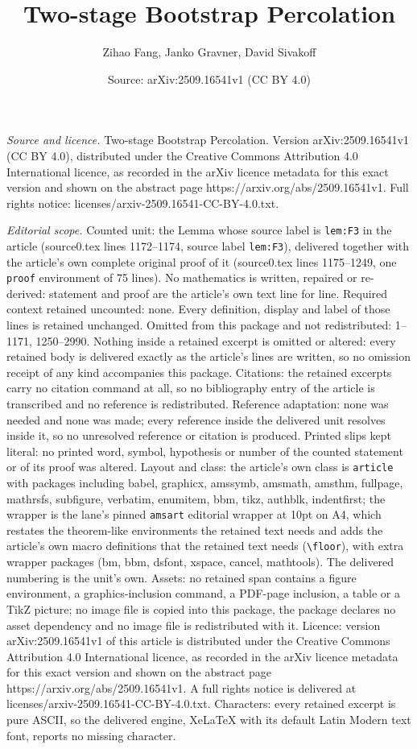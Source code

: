 \documentclass[10pt,a4paper]{amsart}
\title[Two-stage Bootstrap Percolation]{Two-stage Bootstrap Percolation}
\author{Zihao Fang, Janko Gravner, David Sivakoff}
\date{Source: arXiv:2509.16541v1 (CC BY 4.0)}
\begin{document}
\maketitle

\noindent\emph{Source and licence.} Two-stage Bootstrap Percolation. Version arXiv:2509.16541v1 (CC BY 4.0), distributed under the Creative Commons Attribution 4.0 International licence, as recorded in the arXiv licence metadata for this exact version and shown on the abstract page https://arxiv.org/abs/2509.16541v1. Full rights notice: licenses/arxiv-2509.16541-CC-BY-4.0.txt.\par\smallskip

\noindent\textit{Editorial scope.} Counted unit: the Lemma whose source label is \texttt{lem:F3} in the article (source0.tex lines 1172--1174, source label \texttt{lem:F3}), delivered together with the article's own complete original proof of it (source0.tex lines 1175--1249, one \texttt{proof} environment of 75 lines). No mathematics is written, repaired or re-derived: statement and proof are the article's own text line for line. Required context retained uncounted: none. Every definition, display and label of those lines is retained unchanged. Omitted from this package and not redistributed: 1--1171, 1250--2990. Nothing inside a retained excerpt is omitted or altered: every retained body is delivered exactly as the article's lines are written, so no omission receipt of any kind accompanies this package. Citations: the retained excerpts carry no citation command at all, so no bibliography entry of the article is transcribed and no reference is redistributed. Reference adaptation: none was needed and none was made; every reference inside the delivered unit resolves inside it, so no unresolved reference or citation is produced. Printed slips kept literal: no printed word, symbol, hypothesis or number of the counted statement or of its proof was altered. Layout and class: the article's own class is \texttt{article} with packages including babel, graphicx, amssymb, amsmath, amsthm, fullpage, mathrsfs, subfigure, verbatim, enumitem, bbm, tikz, authblk, indentfirst; the wrapper is the lane's pinned \texttt{amsart} editorial wrapper at 10pt on A4, which restates the theorem-like environments the retained text needs and adds the article's own macro definitions that the retained text needs (\texttt{\textbackslash floor}), with extra wrapper packages (bm, bbm, dsfont, xspace, cancel, mathtools). The delivered numbering is the unit's own. Assets: no retained span contains a figure environment, a graphics-inclusion command, a PDF-page inclusion, a table or a TikZ picture; no image file is copied into this package, the package declares no asset dependency and no image file is redistributed with it. Licence: version arXiv:2509.16541v1 of this article is distributed under the Creative Commons Attribution 4.0 International licence, as recorded in the arXiv licence metadata for this exact version and shown on the abstract page https://arxiv.org/abs/2509.16541v1. A full rights notice is delivered at licenses/arxiv-2509.16541-CC-BY-4.0.txt. Characters: every retained excerpt is pure ASCII, so the delivered engine, XeLaTeX with its default Latin Modern text font, reports no missing character.
\end{document}
